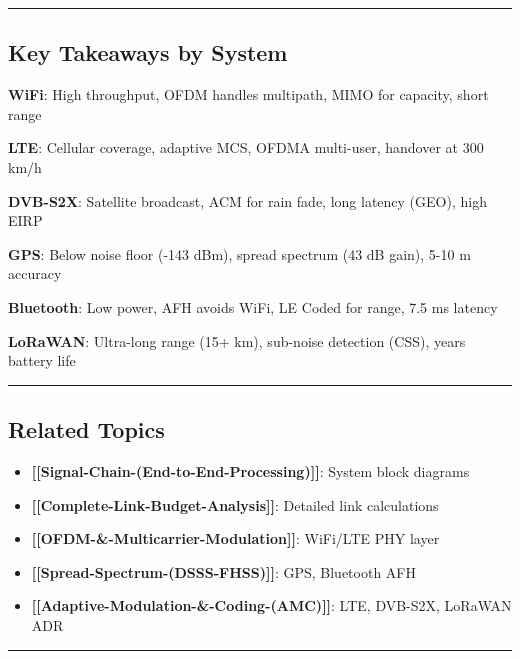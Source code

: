 \begin{center}\rule{0.5\linewidth}{0.5pt}\end{center}

\subsection{Key Takeaways by System}\label{key-takeaways-by-system}

\textbf{WiFi}: High throughput, OFDM handles multipath, MIMO for
capacity, short range

\textbf{LTE}: Cellular coverage, adaptive MCS, OFDMA multi-user,
handover at 300 km/h

\textbf{DVB-S2X}: Satellite broadcast, ACM for rain fade, long latency
(GEO), high EIRP

\textbf{GPS}: Below noise floor (-143 dBm), spread spectrum (43 dB
gain), 5-10 m accuracy

\textbf{Bluetooth}: Low power, AFH avoids WiFi, LE Coded for range, 7.5
ms latency

\textbf{LoRaWAN}: Ultra-long range (15+ km), sub-noise detection (CSS),
years battery life

\begin{center}\rule{0.5\linewidth}{0.5pt}\end{center}

\subsection{Related Topics}\label{related-topics}

\begin{itemize}
\tightlist
\item
  \textbf{{[}{[}Signal-Chain-(End-to-End-Processing){]}{]}}: System
  block diagrams
\item
  \textbf{{[}{[}Complete-Link-Budget-Analysis{]}{]}}: Detailed link
  calculations
\item
  \textbf{{[}{[}OFDM-\&-Multicarrier-Modulation{]}{]}}: WiFi/LTE PHY
  layer
\item
  \textbf{{[}{[}Spread-Spectrum-(DSSS-FHSS){]}{]}}: GPS, Bluetooth AFH
\item
  \textbf{{[}{[}Adaptive-Modulation-\&-Coding-(AMC){]}{]}}: LTE,
  DVB-S2X, LoRaWAN ADR
\end{itemize}

\begin{center}\rule{0.5\linewidth}{0.5pt}\end{center}

